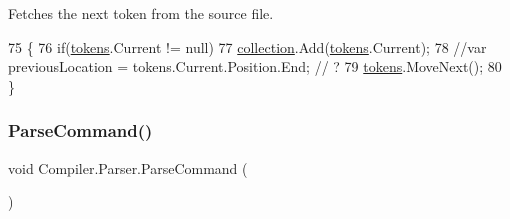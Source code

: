 Fetches the next token from the source file. 
\begin{DoxyCode}
75                                               \{
76                         \textcolor{keywordflow}{if}(\mbox{\hyperlink{class_compiler_1_1_parser_a4db075175c853a197c7b8db7d787a0a5}{tokens}}.Current != null)
77                             \mbox{\hyperlink{class_compiler_1_1_parser_ac30c9381b172d482cc5bb1356c5a901b}{collection}}.Add(\mbox{\hyperlink{class_compiler_1_1_parser_a4db075175c853a197c7b8db7d787a0a5}{tokens}}.Current);
78                         \textcolor{comment}{//var previousLocation = tokens.Current.Position.End; // ?}
79                         \mbox{\hyperlink{class_compiler_1_1_parser_a4db075175c853a197c7b8db7d787a0a5}{tokens}}.MoveNext();
80                     \}
\end{DoxyCode}
\mbox{\label{class_compiler_1_1_parser_a7ab30d3d783ccf064784df2df654ea76}} 
\subsubsection{\texorpdfstring{Parse\+Command()}{ParseCommand()}}
{\footnotesize\ttfamily void Compiler.\+Parser.\+Parse\+Command (\begin{DoxyParamCaption}{ }\end{DoxyParamCaption})\hspace{0.3cm}{\ttfamily [protected]}}

